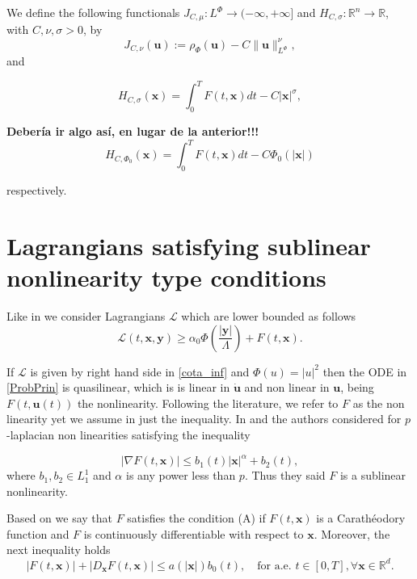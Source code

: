 \documentclass[twoside]{article}
\theoremstyle{remark}
\newcommand{\orlnor}{\|_{L^{\Phi}}}
\newcommand{\lphi}{L^{\Phi}}
\renewcommand{\b}[1]{\boldsymbol{#1}}
\newcommand{\rr}{\mathbb{R}}
\renewcommand{\leq}{\leqslant}
\begin{document}
We define the following  functionals $J_{C,\mu}:\lphi\to (-\infty,+\infty]$ and $  H_{C,\sigma}:\rr^n\to \rr$, with $C,\nu,\sigma>0$, by
\begin{equation}\label{func_phi}
  J_{C,\nu}(\b{u}):= \rho_{\Phi}\left(\b{u}\right)-C\|\b{u}\orlnor^{\nu},
\end{equation}
 and

\begin{equation}\label{eq:functional_H}
 H_{C,\sigma}(\b{x})=\int_0^TF(t,\b{x})dt-C|\b{x}|^{\sigma},
\end{equation}

{\bf Deber\'ia ir algo as\'i, en lugar de la anterior!!!}
\begin{equation}\label{eq:functional_H-bis}
 H_{C,\Phi_0}(\b{x})=\int_0^TF(t,\b{x})dt-C\Phi_0(|\b{x}|)
\end{equation}

respectively.





\section{Lagrangians satisfying  sublinear nonlinearity type conditions}


Like in \cite{ABGMS2015} we consider Lagrangians $\mathcal{L}$ which are lower bounded as follows 
\begin{equation}\label{cota_inf}
\mathcal{L}(t,\b{x},\b{y})\geq \alpha_0\Phi\left(\frac{|\b{y}|}{\Lambda}\right)+ F(t,\b{x}).
\end{equation}

If $\mathcal{L}$ is given by right hand side in \eqref{cota_inf} and $\Phi(u)=|u|^2$ then the ODE in \eqref{ProbPrin} is quasilinear, which is is linear in $\b{\dot{u}}$ and non linear in $\b{u}$, being  $F(t,\b{u}(t))$ the nonlinearity. Following the literature, we refer to $F$ as the non linearity yet we assume in \label{cota_inf} just the inequality. In \cite{tang1998periodic} and \cite{tang2010periodic} the authors considered for $p$-laplacian non linearities satisfying the inequality

\[ |\nabla F(t,\b{x})|\leq b_1(t)|\b{x}|^{\alpha}+b_2(t),\]
where  $b_1,b_2 \in L^1_1$ and $\alpha$ is any power less than $p$. Thus they said $F$ is a sublinear nonlinearity. 


Based on \cite{mawhin2010critical} we say that $F$ satisfies the condition (A) if  $F(t,\b{x})$ is a Carath\'eo\-dory function and  $F$ is continuously differentiable with respect to $\b{x}$. Moreover, the next inequality holds 
\begin{equation}\label{condA2}|F(t,\b{x})|+ |D_{\b{x}}F(t,\b{x})|\leq a(|\b{x}|)b_0(t),\quad\text{for a.e. }t\in [0,T], \forall\b{x}\in\rr^d.
\end{equation}
\end{document}
